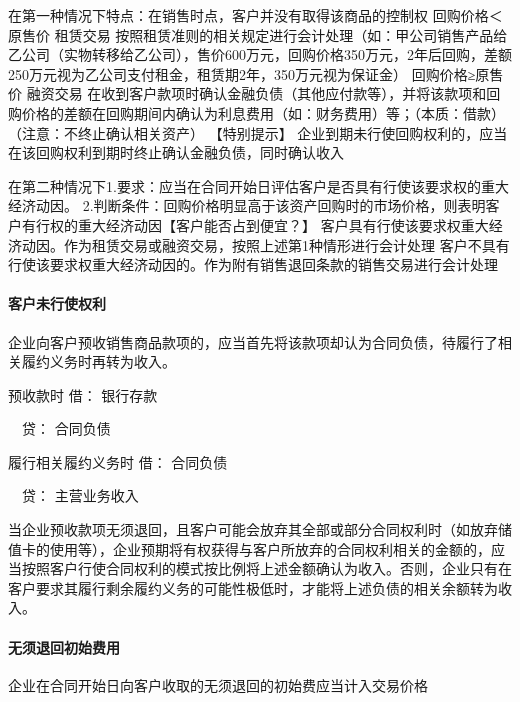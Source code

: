 \documentclass[UTF8,12pt]{ctexart}
\newenvironment{Dr}{\noindent 借：}{\par}
\newenvironment{Cr}{\noindent \ \ 贷：}{\par}
\numberwithin{equation}{section} %
\numberwithin{figure}{section}
\numberwithin{table}{section}
\begin{document}
	在第一种情况下特点：在销售时点，客户并没有取得该商品的控制权
	回购价格＜原售价	租赁交易	按照租赁准则的相关规定进行会计处理（如：甲公司销售产品给乙公司（实物转移给乙公司），售价600万元，回购价格350万元，2年后回购，差额250万元视为乙公司支付租金，租赁期2年，350万元视为保证金）
	回购价格≥原售价	融资交易	在收到客户款项时确认金融负债（其他应付款等），并将该款项和回购价格的差额在回购期间内确认为利息费用（如：财务费用）等；（本质：借款）（注意：不终止确认相关资产）
	【特别提示】
	企业到期未行使回购权利的，应当在该回购权利到期时终止确认金融负债，同时确认收入
	
	在第二种情况下1.要求：应当在合同开始日评估客户是否具有行使该要求权的重大经济动因。
	2.判断条件：回购价格明显高于该资产回购时的市场价格，则表明客户有行权的重大经济动因【客户能否占到便宜？】
	客户具有行使该要求权重大经济动因。作为租赁交易或融资交易，按照上述第1种情形进行会计处理
	客户不具有行使该要求权重大经济动因的。作为附有销售退回条款的销售交易进行会计处理
	
	
	\paragraph{客户未行使权利}
	企业向客户预收销售商品款项的，应当首先将该款项却认为合同负债，待履行了相关履约义务时再转为收入。
	
	预收款时
	\begin{Dr}
		银行存款
	\end{Dr}
	\begin{Cr}
		合同负债
	\end{Cr}
	
	履行相关履约义务时
	\begin{Dr}
		合同负债
	\end{Dr}
	\begin{Cr}
		主营业务收入
	\end{Cr}
	
	当企业预收款项无须退回，且客户可能会放弃其全部或部分合同权利时（如放弃储值卡的使用等），企业预期将有权获得与客户所放弃的合同权利相关的金额的，应当按照客户行使合同权利的模式按比例将上述金额确认为收入。否则，企业只有在客户要求其履行剩余履约义务的可能性极低时，才能将上述负债的相关余额转为收入。
	
	
	\paragraph{无须退回初始费用}
	企业在合同开始日向客户收取的无须退回的初始费应当计入交易价格
	
\end{document}
